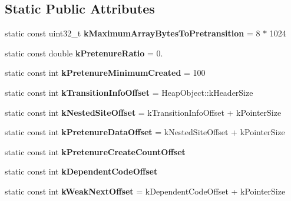 \subsection*{Static Public Attributes}
\begin{DoxyCompactItemize}
\item 
\hypertarget{classv8_1_1internal_1_1_allocation_site_aeead57f97b16bf614a5631349d0bc7f1}{}static const uint32\+\_\+t {\bfseries k\+Maximum\+Array\+Bytes\+To\+Pretransition} = 8 $\ast$ 1024\label{classv8_1_1internal_1_1_allocation_site_aeead57f97b16bf614a5631349d0bc7f1}

\item 
\hypertarget{classv8_1_1internal_1_1_allocation_site_a45d58b4d64823e7d33eeb2291b26fb3a}{}static const double {\bfseries k\+Pretenure\+Ratio} = 0.\label{classv8_1_1internal_1_1_allocation_site_a45d58b4d64823e7d33eeb2291b26fb3a}

\item 
\hypertarget{classv8_1_1internal_1_1_allocation_site_a60cc20b9d1f816783e6c112029776861}{}static const int {\bfseries k\+Pretenure\+Minimum\+Created} = 100\label{classv8_1_1internal_1_1_allocation_site_a60cc20b9d1f816783e6c112029776861}

\item 
\hypertarget{classv8_1_1internal_1_1_allocation_site_ab16a1b6151317cfa89ad5ff7d49f7f23}{}static const int {\bfseries k\+Transition\+Info\+Offset} = Heap\+Object\+::k\+Header\+Size\label{classv8_1_1internal_1_1_allocation_site_ab16a1b6151317cfa89ad5ff7d49f7f23}

\item 
\hypertarget{classv8_1_1internal_1_1_allocation_site_af3315748586cedda1896811766e0f944}{}static const int {\bfseries k\+Nested\+Site\+Offset} = k\+Transition\+Info\+Offset + k\+Pointer\+Size\label{classv8_1_1internal_1_1_allocation_site_af3315748586cedda1896811766e0f944}

\item 
\hypertarget{classv8_1_1internal_1_1_allocation_site_a1700918589b01582d697f3e1b4916e8b}{}static const int {\bfseries k\+Pretenure\+Data\+Offset} = k\+Nested\+Site\+Offset + k\+Pointer\+Size\label{classv8_1_1internal_1_1_allocation_site_a1700918589b01582d697f3e1b4916e8b}

\item 
static const int {\bfseries k\+Pretenure\+Create\+Count\+Offset}
\item 
static const int {\bfseries k\+Dependent\+Code\+Offset}
\item 
\hypertarget{classv8_1_1internal_1_1_allocation_site_a455b0be20fe32fd7e81fcdc4ca510484}{}static const int {\bfseries k\+Weak\+Next\+Offset} = k\+Dependent\+Code\+Offset + k\+Pointer\+Size\label{classv8_1_1internal_1_1_allocation_site_a455b0be20fe32fd7e81fcdc4ca510484}


\end{DoxyCompactItemize}
